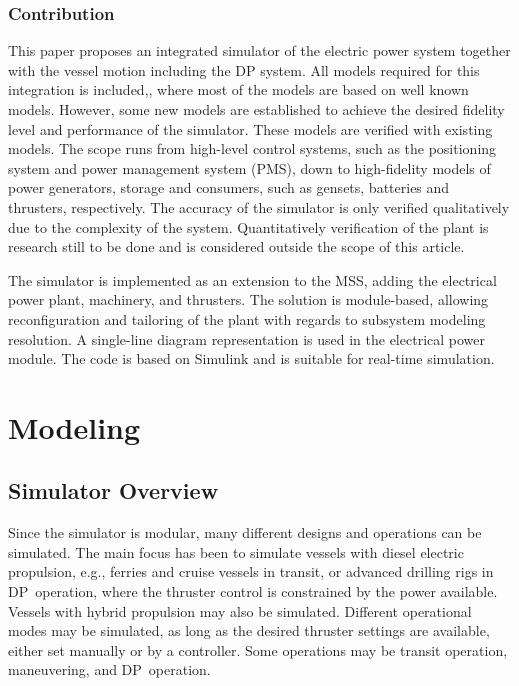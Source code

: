 \documentclass[journal]{IEEEtran}
\begin{document}
\subsubsection{Contribution}
This paper proposes an integrated simulator of the electric power system together with the vessel motion including the DP system. 
All models required for this integration is included,, where most of the models are based on well known models.
However, some new models are established to achieve the desired fidelity level and performance of the simulator.
These models are verified with existing models.
The scope runs from high-level control systems, such as the positioning system and power management system (PMS), down to high-fidelity models of power generators, storage and consumers, such as gensets, batteries and thrusters, respectively.
The accuracy of the simulator is only verified qualitatively due to the complexity of the system.
Quantitatively verification of the plant is research still to be done and is considered outside the scope of this article.

The simulator is implemented as an extension to the MSS, adding the electrical power plant, machinery, and thrusters. The solution is module-based, allowing reconfiguration and tailoring of the plant with regards to subsystem modeling resolution. A single-line diagram representation is used in the electrical power module. The code is based on Simulink and is suitable for real-time simulation.

\section{Modeling}

\subsection{Simulator Overview}
Since the simulator is modular, many different designs and operations can be simulated.
The main focus has been to simulate vessels with diesel electric propulsion, e.g., ferries and cruise vessels in transit, or advanced drilling rigs in DP~operation, where the thruster control is constrained by the power available.
Vessels with hybrid propulsion may also be simulated.
Different operational modes may be simulated, as long as the desired thruster settings are available, either set manually or by a controller. 
Some operations may be transit operation, maneuvering, and DP~operation.
\end{document}
